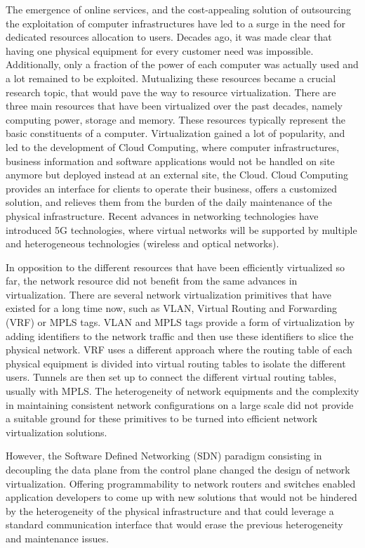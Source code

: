 The emergence of online services, and the cost-appealing solution of outsourcing the exploitation of computer infrastructures have led to a surge in the need for dedicated resources allocation to users. Decades ago, it was made clear that having one physical equipment for every customer need was impossible. Additionally, only a fraction of the power of each computer was actually used and a lot remained to be exploited.
Mutualizing these resources became a crucial research topic, that would pave the way to resource virtualization. 
There are three main resources that have been virtualized over the past decades, namely computing power, storage and memory.
These resources typically represent the basic constituents of a computer.
Virtualization gained a lot of popularity, and led to the development of Cloud Computing, where computer infrastructures, business information and software applications would not be handled on site anymore but deployed instead at an external site, \ie the Cloud. 
Cloud Computing provides an interface for clients to operate their business, offers a customized solution, and relieves them from the burden of the daily maintenance of the physical infrastructure. Recent advances in networking technologies have introduced 5G technologies, where virtual networks will be supported by multiple and heterogeneous technologies (\eg wireless and optical networks).

In opposition to the different resources that have been efficiently virtualized so far, the network resource did not benefit from the same advances in virtualization.
There are several network virtualization primitives that have existed for a long time now, such as VLAN, Virtual Routing and Forwarding (VRF) or MPLS tags. VLAN and MPLS tags provide a form of virtualization by adding identifiers to the network traffic and then use these identifiers to slice the physical network. VRF uses a different approach where the routing table of each physical equipment is divided into virtual routing tables to isolate the different users. Tunnels are then set up to connect the different virtual routing tables, usually with MPLS.
The heterogeneity of network equipments and the complexity in maintaining consistent network configurations on a large scale did not provide a suitable ground for these primitives to be turned into efficient network virtualization solutions.

However, the Software Defined Networking (SDN) paradigm consisting in decoupling the data plane from the control plane changed the design of network virtualization. Offering programmability to network routers and switches enabled application developers to come up with new solutions that would not be hindered by the heterogeneity of the physical infrastructure and that could leverage a standard communication interface that would erase the previous heterogeneity and maintenance issues.

